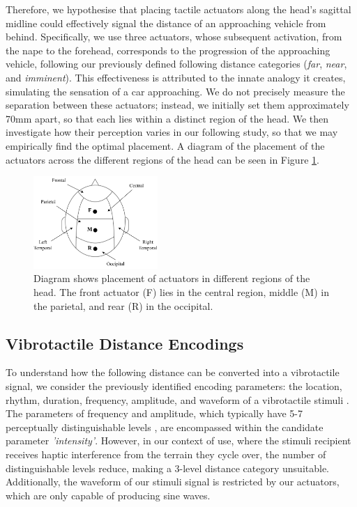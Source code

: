 \documentclass{mpaper}
\begin{document}
Therefore, we hypothesise that placing tactile actuators along the head's sagittal midline could effectively signal the distance of an approaching vehicle from behind. Specifically, we use three actuators, whose subsequent activation, from the nape to the forehead, corresponds to the progression of the approaching vehicle, following our previously defined following distance categories (\textit{far}, \textit{near}, and \textit{imminent}). This effectiveness is attributed to the innate analogy it creates, simulating the sensation of a car approaching. We do not precisely measure the separation between these actuators; instead, we initially set them approximately 70mm apart, so that each lies within a distinct region of the head. We then investigate how their perception varies in our following study, so that we may empirically find the optimal placement. A diagram of the placement of the actuators across the different regions of the head can be seen in Figure \ref{fig:head-regions}.


\begin{figure}[ht]
    \centering
    \includegraphics[width=0.42\textwidth]{images/tactor-placement.pdf}
    \caption{Diagram shows placement of actuators in different regions of the head. The front actuator (F) lies in the central region, middle (M) in the parietal, and rear (R) in the occipital.}
    \label{fig:head-regions}
\end{figure}



\subsection{Vibrotactile Distance Encodings}
To understand how the following distance can be converted into a vibrotactile signal, we consider the previously identified encoding parameters: the location, rhythm, duration, frequency, amplitude, and waveform of a vibrotactile stimuli \cite{guidelines, 10.5555/976310.976313}. The parameters of frequency and amplitude, which typically have 5-7 perceptually distinguishable levels \cite{guidelines}, are encompassed within the candidate parameter \textit{'intensity'}. However, in our context of use, where the stimuli recipient receives haptic interference from the terrain they cycle over, the number of distinguishable levels reduce, making a 3-level distance category unsuitable. Additionally, the waveform of our stimuli signal is restricted by our actuators, which are only capable of producing sine waves.
\end{document}
